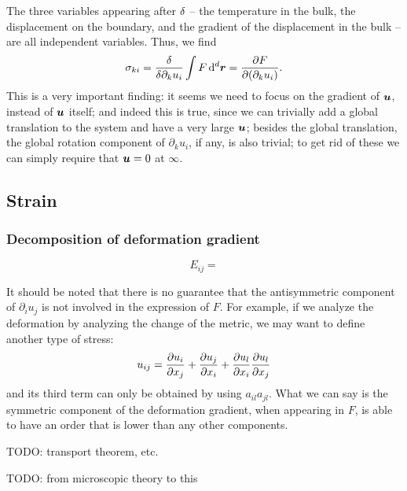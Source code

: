 \documentclass[hyperref, a4paper]{article}
\begin{document}
The three variables appearing after $\var$ -- the temperature in the bulk,
the displacement on the boundary,
and the gradient of the displacement in the bulk -- 
are all independent variables.
Thus, we find 
\begin{equation}
    \sigma_{ki} = \fdv{\partial_k u_i} \int F \dd[d]{\vb*{r}} = \pdv{F}{(\partial_k u_i)}.
\end{equation}
This is a very important finding:
it seems we need to focus on the gradient of $\vb*{u}$,
instead of $\vb*{u}$ itself;
and indeed this is true,
since we can trivially add a global translation to the system 
and have a very large $\vb*{u}$;
besides the global translation,
the global rotation component of $\partial_k u_i$, if any, is also trivial;
to get rid of these we can simply require that $\vb*{u} = 0$ at $\infty$.

\subsection{Strain}

\subsubsection{Decomposition of deformation gradient}

\begin{equation}
    E_{ij} =
\end{equation}

It should be noted that there is no guarantee 
that the antisymmetric component of $\partial_i u_j$ is not involved 
in the expression of $F$.
For example, if we analyze the deformation by 
analyzing the change of the metric,
we may want to define another type of stress: 
\begin{equation}
    u_{ij} = \pdv{u_i}{x_j} + \pdv{u_j}{x_i} + \pdv{u_l}{x_i} \pdv{u_l}{x_j}
\end{equation}
and its third term can only be obtained by using $a_{il} a_{jl}$.
What we can say is the symmetric component of the deformation gradient,
when appearing in $F$,
is able to have an order that is lower than 
any other components.

TODO: transport theorem, etc.

TODO: from microscopic theory to this

\subsubsection{}
\end{document}
